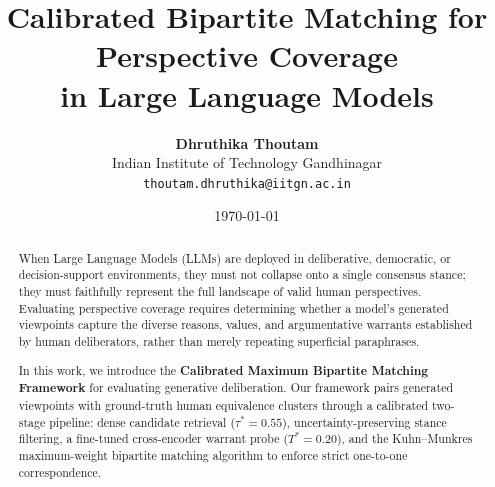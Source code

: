 \documentclass[11pt,a4paper]{article}
\title{\textbf{\Large Calibrated Bipartite Matching for Perspective Coverage\\in Large Language Models}}
\author{
  \textbf{Dhruthika Thoutam} \\
  Indian Institute of Technology Gandhinagar \\
  \texttt{thoutam.dhruthika@iitgn.ac.in}
}
\date{\today}
\begin{document}
\maketitle

\begin{abstract}
When Large Language Models (LLMs) are deployed in deliberative, democratic, or decision-support environments, they must not collapse onto a single consensus stance; they must faithfully represent the full landscape of valid human perspectives. Evaluating perspective coverage requires determining whether a model's generated viewpoints capture the diverse reasons, values, and argumentative warrants established by human deliberators, rather than merely repeating superficial paraphrases. 

In this work, we introduce the \textbf{Calibrated Maximum Bipartite Matching Framework} for evaluating generative deliberation. Our framework pairs generated viewpoints with ground-truth human equivalence clusters through a calibrated two-stage pipeline: dense candidate retrieval ($\tau^* = 0.55$), uncertainty-preserving stance filtering, a fine-tuned cross-encoder warrant probe ($T^* = 0.20$), and the Kuhn--Munkres maximum-weight bipartite matching algorithm to enforce strict one-to-one correspondence.


\end{abstract}
\end{document}
